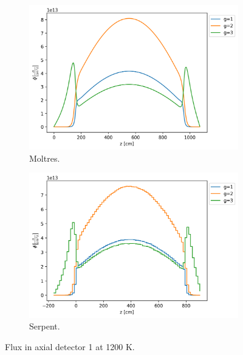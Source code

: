 \documentclass[11pt,letterpaper]{article}
\begin{document}
\begin{figure}[htbp!]
	\centering
	\begin{subfigure}[t]{0.4\textwidth}
		\centering
		\includegraphics[width=\linewidth]{figures-fullcore/3D-fullcore-1200-15Gc-axial1}
		\caption{Moltres.}
	\end{subfigure}
	\begin{subfigure}[t]{0.4\textwidth}
		\centering
		\includegraphics[width=\linewidth]{figures-fullcore/serpent26G-1200-collapse-Axial1}
		\caption{Serpent.}
	\end{subfigure}
	\hfill
	\caption{Flux in axial detector 1 at 1200 K.}
	\label{fig:fullcore-1200-axial1}
\end{figure}
\end{document}
